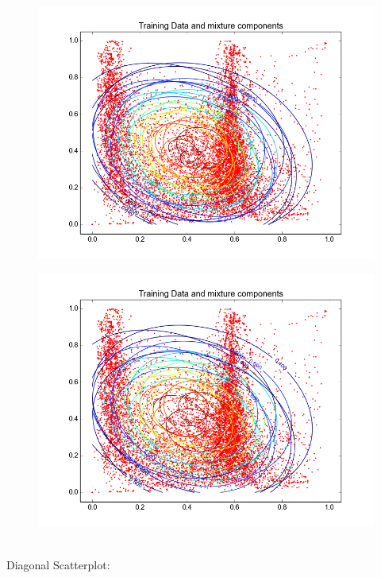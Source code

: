 \documentclass[11pt,a4paper]{article}
\begin{document}
\begin{minipage}[b]{0.25\textwidth}
\begin{figure}[H]
  \centering
  \includegraphics[width=.8\linewidth]{Figures/contourscoast15.png}

  \label{fig:sfig1}
\end{figure}%
\end{minipage}
\begin{minipage}[b]{0.25\textwidth}
\begin{figure}[H]
  \centering
  \includegraphics[width=.8\linewidth]{Figures/contourscoast30.png}

  \label{fig:sfig1}
\end{figure}%
\end{minipage}
\\
Diagonal Scatterplot: \\
\end{document}
